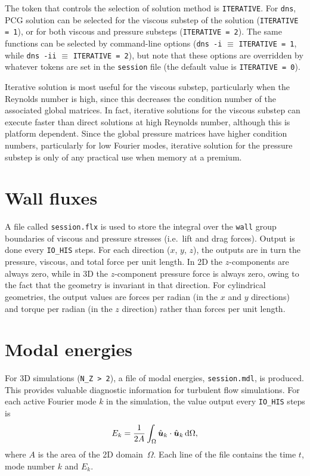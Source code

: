 \documentclass[11pt,a4paper]{report}
\def\bs#1{\mbox{\boldmath$#1$}}                     %
\begin{document}
The token that controls the selection of solution method is
\verb+ITERATIVE+.  For \verb+dns+, PCG solution can be selected for
the viscous substep of the solution (\verb+ITERATIVE = 1+), or for
both viscous and pressure substeps (\verb+ITERATIVE = 2+).  The same
functions can be selected by command-line options (\verb+dns -i+
$\equiv$ \verb+ITERATIVE = 1+, while \verb+dns -ii+ $\equiv$
\verb+ITERATIVE = 2+), but note that these options are overridden by
whatever tokens are set in the \verb+session+ file (the default value
is \verb+ITERATIVE = 0+).

Iterative solution is most useful for the viscous substep,
particularly when the Reynolds number is high, since this decreases
the condition number of the associated global matrices.  In fact,
iterative solutions for the viscous substep can execute faster than
direct solutions at high Reynolds number, although this is platform
dependent.  Since the global pressure matrices have higher condition
numbers, particularly for low Fourier modes, iterative solution for
the pressure substep is only of any practical use when memory at a
premium.

\section{Wall fluxes}

A file called \verb+session.flx+ is used to store the integral over
the \verb+wall+ group boundaries of viscous and pressure stresses
(i.e.\ lift and drag forces).  Output is done every \verb+IO_HIS+
steps.  For each direction ($x$, $y$, $z$), the outputs are in turn
the pressure, viscous, and total force per unit length.  In 2D the
$z$-components are always zero, while in 3D the $z$-component pressure
force is always zero, owing to the fact that the geometry is invariant
in that direction.  For cylindrical geometries, the output values are
forces per radian (in the $x$ and $y$ directions) and torque per
radian (in the $z$ direction) rather than forces per unit length.

\section{Modal energies}

For 3D simulations (\verb+N_Z > 2+), a file of modal energies,
\verb+session.mdl+, is produced.  This provides valuable diagnostic
information for turbulent flow simulations.  For each active Fourier
mode $k$ in the simulation, the value output every \verb+IO_HIS+ steps
is 
\[
E_k =
\frac{1}{2A}\int_\Omega
\hat{\bs{u}}_k\cdot\hat{\bs{u}}_k \,{\rm d}\Omega,
\]
where $A$ is the area of the 2D domain~$\Omega$.  Each line of the
file contains the time $t$, mode number $k$ and $E_k$.
\end{document}
